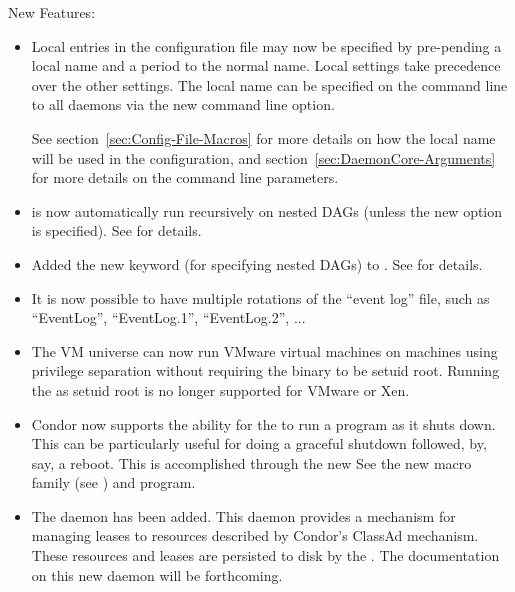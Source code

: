 \noindent New Features:

\begin{itemize}

\item Local entries in the configuration file may now be specified
by pre-pending a local name and a period to the normal name.
Local settings take precedence over the other settings.
The local name can be specified on the command line to all daemons via
the new  command line option. 

See section~\ref{sec:Config-File-Macros} 
for more details on how the local name will be used in the configuration,
and section~\ref{sec:DaemonCore-Arguments} 
for more details on the command line parameters.

\item {} is now automatically run recursively on
nested DAGs (unless the new  option is specified).
See \pageref{dagman:NestedRecursion} for details.

\item Added the new  keyword (for specifying nested
DAGs) to .  See \pageref{dagman:SUBDAG} for details.

\item It is now possible to have multiple rotations of the ``event
  log'' file, such as ``EventLog'', ``EventLog.1'', ``EventLog.2'', ...

\item The VM universe can now run VMware virtual machines on machines using
privilege separation without requiring the  binary to be
setuid root. Running the  as setuid root is no longer
supported for VMware or Xen.

\item Condor now supports the ability for the  to run a
  program as it shuts down.  This can be particularly useful for doing
  a graceful shutdown followed, by, say, a reboot.  This is
  accomplished through the new See the new
   macro family (see
  \pageref{param:MasterShutdownProgram}) and 
  program.

\item The  daemon has been added.  This daemon
  provides a mechanism for managing leases to resources described by
  Condor's ClassAd mechanism.  These resources and leases are
  persisted to disk by the .  The documentation
  on this new daemon will be forthcoming.


\end{itemize}
